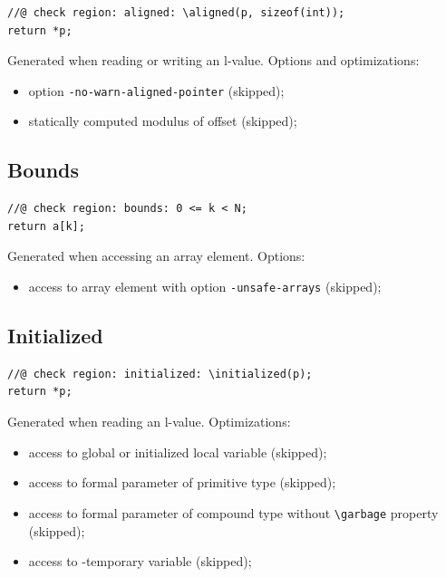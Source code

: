 \begin{lstlisting}
//@ check region: aligned: \aligned(p, sizeof(int));
return *p;
\end{lstlisting}

Generated when reading or writing an l-value. Options and optimizations:
\begin{itemize}
  \item option \verb+-no-warn-aligned-pointer+ (skipped);
  \item statically computed modulus of offset (skipped);
\end{itemize}

\subsection{Bounds}

\begin{lstlisting}
//@ check region: bounds: 0 <= k < N;
return a[k];
\end{lstlisting}

Generated when accessing an array element. Options:
\begin{itemize}
  \item access to array element with option \verb+-unsafe-arrays+ (skipped);
\end{itemize}

\subsection{Initialized}

\begin{lstlisting}
//@ check region: initialized: \initialized(p);
return *p;
\end{lstlisting}

Generated when reading an l-value.
Optimizations:
\begin{itemize}
  \item access to global or initialized local variable (skipped);
  \item access to formal parameter of primitive type (skipped);
  \item access to formal parameter of compound type without \verb+\garbage+
  property (skipped);
  \item access to -temporary variable (skipped);
\end{itemize}

